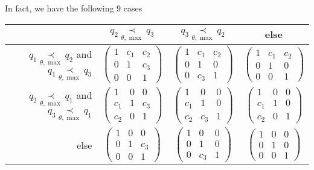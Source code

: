 In fact, we have the following $9$ cases 
\begin{center}
  \def\arraystretch{1.3}
  \setlength\tabcolsep{4mm}
  \begin{tabular}{r|c|c|c}
    & $q_2 \underset{\theta,\max}{\prec} q_3$
    & $q_3 \underset{\theta,\max}{\prec} q_2$
    & else
    \tabularnewline
    \hline
    $q_1 \underset{\theta,\max}{\prec} q_2$ and
    $q_1 \underset{\theta,\max}{\prec} q_3$
    & $\begin{pmatrix} 1 & c_1 & c_2 \\0 & 1 & c_3 \\0 & 0 & 1 \end{pmatrix}$
   \cellcolor{blue!15}
    & $\begin{pmatrix} 1 & c_1 & c_2 \\0 & 1 & 0 \\0 & c_3 & 1 \end{pmatrix}$
   \cellcolor{blue!15}
    & $\begin{pmatrix} 1 & c_1 & c_2 \\0 & 1 & 0 \\0 & 0 & 1 \end{pmatrix}$
   \cellcolor{green!15}
    \tabularnewline
    \hline
    $q_2 \underset{\theta,\max}{\prec} q_1$ and
    $q_3 \underset{\theta,\max}{\prec} q_1$
    & $\begin{pmatrix} 1 & 0 & 0 \\c_1 & 1 & c_3 \\c_2 & 0 & 1 \end{pmatrix}$
   \cellcolor{blue!15}
    & $\begin{pmatrix} 1 & 0 & 0 \\c_1 & 1 & 0 \\c_2 & c_3 & 1 \end{pmatrix}$
   \cellcolor{blue!15}
    & $\begin{pmatrix} 1 & 0 & 0 \\c_1 & 1 & 0 \\c_2 & 0 & 1 \end{pmatrix}$
   \cellcolor{green!15}
    \tabularnewline
    \hline
    else
    & $\begin{pmatrix} 1 & 0 & 0 \\0 & 1 & c_3 \\0 & 0 & 1 \end{pmatrix}$
   \cellcolor{purple!15}
    & $\begin{pmatrix} 1 & 0 & 0 \\0 & 1 & 0 \\0 & c_3 & 1 \end{pmatrix}$
   \cellcolor{purple!15}
    & $\begin{pmatrix} 1 & 0 & 0 \\0 & 1 & 0 \\0 & 0 & 1 \end{pmatrix}$
  \end{tabular}
\end{center}
